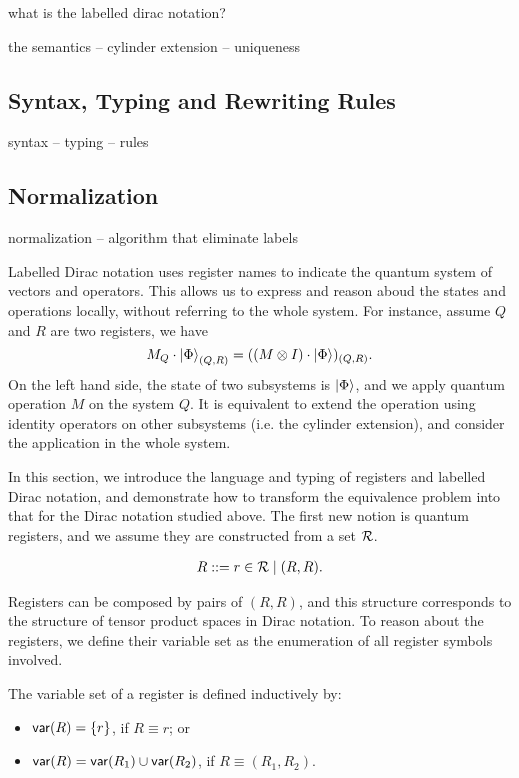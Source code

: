 what is the labelled dirac notation?

the semantics -- cylinder extension -- uniqueness

\subsection{Syntax, Typing and Rewriting Rules}

syntax -- typing -- rules

\subsection{Normalization}

normalization -- algorithm that eliminate labels



Labelled Dirac notation uses register names to indicate the quantum system of vectors and operators. This allows us to express and reason aboud the states and operations locally, without referring to the whole system. For instance, assume $Q$ and $R$ are two registers, we have
\[
    M_Q \cdot \ket{\Phi}_{(Q, R)} = ((M \otimes I) \cdot \ket{\Phi})_{(Q, R)}.
\]
On the left hand side, the state of two subsystems is $\ket{\Phi}$, and we apply quantum operation $M$ on the system $Q$. It is equivalent to extend the operation using identity operators on other subsystems (i.e. the cylinder extension), and consider the application in the whole system.


In this section, we introduce the language and typing of registers and labelled Dirac notation, and demonstrate how to transform the equivalence problem into that for the Dirac notation studied above.
The first new notion is quantum registers, and we assume they are constructed from a set $\mathcal{R}$.
\begin{definition}
  \begin{align*}
    R ::= r\in\mathcal{R} \mid (R, R).
  \end{align*}
\end{definition}

Registers can be composed by pairs of $(R, R)$, and this structure corresponds to the structure of tensor product spaces in Dirac notation.
To reason about the registers, we define their variable set as the enumeration of all register symbols involved.

\begin{definition}
The variable set of a register is defined inductively by:
\begin{itemize}
    \item $\mathsf{var}(R) = \{r\}$, if $R\equiv r$; or
    \item $\mathsf{var}(R) = \mathsf{var}(R_1) \cup\mathsf{var}(R_2)$, if $R\equiv (R_1,R_2)$.
\end{itemize}
\end{definition}

